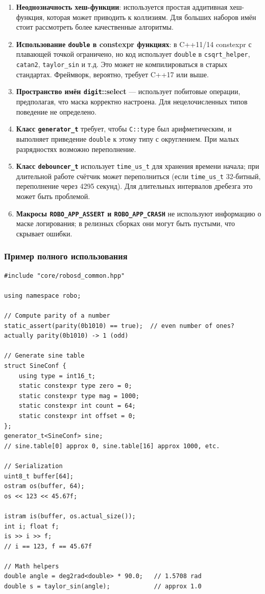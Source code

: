 \documentclass[a4paper,12pt]{article}
\begin{document}
\begin{enumerate}
    \item \textbf{Неоднозначность хеш-функции}: используется простая аддитивная хеш-функция, которая может приводить к коллизиям. Для больших наборов имён стоит рассмотреть более качественные алгоритмы.
    \item \textbf{Использование \texttt{double} в constexpr функциях}: в C++11/14 constexpr с плавающей точкой ограничено, но код использует \texttt{double} в \texttt{csqrt\_helper}, \texttt{catan2}, \texttt{taylor\_sin} и т.д. Это может не компилироваться в старых стандартах. Фреймворк, вероятно, требует C++17 или выше.
    \item \textbf{Пространство имён \texttt{digit}::select} — использует побитовые операции, предполагая, что маска корректно настроена. Для нецелочисленных типов поведение не определено.
    \item \textbf{Класс \texttt{generator\_t}} требует, чтобы \texttt{C::type} был арифметическим, и выполняет приведение \texttt{double} к этому типу с округлением. При малых разрядностях возможно переполнение.
    \item \textbf{Класс \texttt{debouncer\_t}} использует \texttt{time\_us\_t} для хранения времени начала; при длительной работе счётчик может переполниться (если \texttt{time\_us\_t} 32-битный, переполнение через 4295 секунд). Для длительных интервалов дребезга это может быть проблемой.
    \item \textbf{Макросы \texttt{ROBO\_APP\_ASSERT} и \texttt{ROBO\_APP\_CRASH}} не используют информацию о маске логирования; в релизных сборках они могут быть пустыми, что скрывает ошибки.
\end{enumerate}

\subsubsection{Пример полного использования}

\begin{lstlisting}[caption={Mixing common utilities}]
#include "core/robosd_common.hpp"

using namespace robo;

// Compute parity of a number
static_assert(parity(0b1010) == true);  // even number of ones? actually parity(0b1010) -> 1 (odd)

// Generate sine table
struct SineConf {
    using type = int16_t;
    static constexpr type zero = 0;
    static constexpr type mag = 1000;
    static constexpr int count = 64;
    static constexpr int offset = 0;
};
generator_t<SineConf> sine;
// sine.table[0] approx 0, sine.table[16] approx 1000, etc.

// Serialization
uint8_t buffer[64];
ostram os(buffer, 64);
os << 123 << 45.67f;

istram is(buffer, os.actual_size());
int i; float f;
is >> i >> f;
// i == 123, f == 45.67f

// Math helpers
double angle = deg2rad<double> * 90.0;   // 1.5708 rad
double s = taylor_sin(angle);            // approx 1.0
\end{lstlisting}
\end{document}
